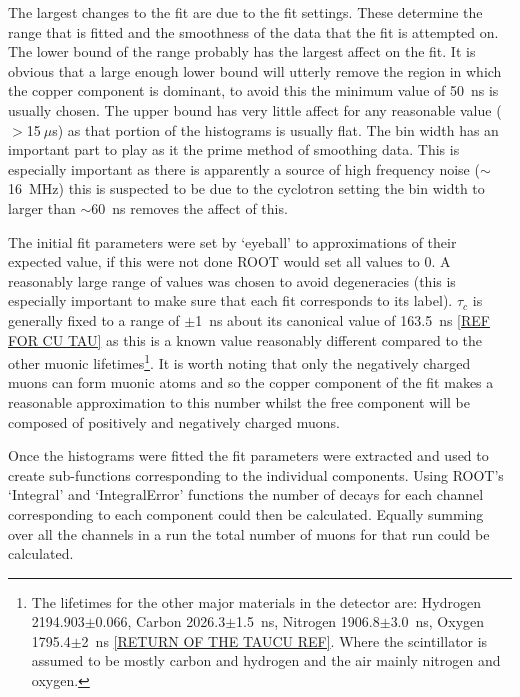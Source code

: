 \documentclass[]{article}
\newcommand{\ms}{$~\mu$s}
\begin{document}
The largest changes to the fit are due to the fit settings. These determine the range that is fitted and the smoothness of the data that the fit is attempted on. The lower bound of the range probably has the largest affect on the fit. It is obvious that a large enough lower bound will utterly remove the region in which the copper component is dominant, to avoid this the minimum value of 50~ns is usually chosen. The upper bound has very little affect for any reasonable value ($>$15\ms) as that portion of the histograms is usually flat. The bin width has an important part to play as it the prime method of smoothing data. This is especially important as there is apparently a source of high frequency noise ($\sim$16~MHz) this is suspected to be due to the cyclotron setting the bin width to larger than $\sim$60~ns removes the affect of this.

The initial fit parameters were set by `eyeball' to approximations of their expected value, if this were not done ROOT would set all values to 0. A reasonably large range of values was chosen to avoid degeneracies (this is especially important to make sure that each fit corresponds to its label). $\tau_{c}$ is generally fixed to a range of $\pm$1~ns about its canonical value of 163.5~ns \ref{REF FOR CU TAU} as this is a known value reasonably different compared to the other muonic lifetimes\footnote{The lifetimes for the other major materials in the detector are: Hydrogen 2194.903$\pm$0.066, Carbon 2026.3$\pm$1.5~ns, Nitrogen 1906.8$\pm$3.0~ns, Oxygen 1795.4$\pm$2~ns \ref{RETURN OF THE TAUCU REF}. Where the scintillator is assumed to be mostly carbon and hydrogen and the air mainly nitrogen and oxygen.}. It is worth noting that only the negatively charged muons can form muonic atoms and so the copper component of the fit makes a reasonable approximation to this number whilst the free component will be composed of positively and negatively charged muons.

Once the histograms were fitted the fit parameters were extracted and used to create sub-functions corresponding to the individual components. Using ROOT's `Integral' and `IntegralError' functions the number of decays for each channel corresponding to each component could then be calculated. Equally summing over all the channels in a run the total number of muons for that run could be calculated.
\end{document}
